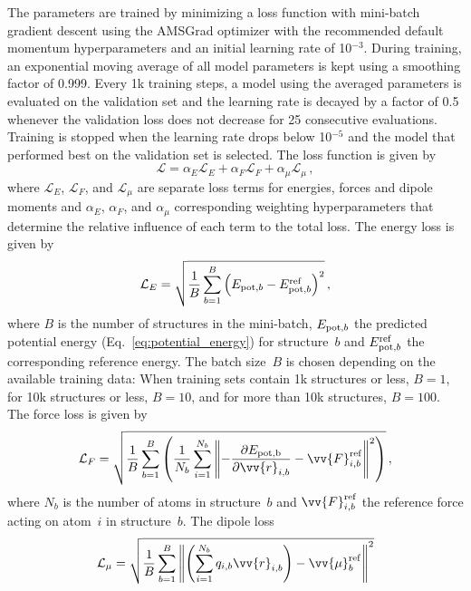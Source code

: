\documentclass[%
superscriptaddress,
reprint,
nofootinbib,
amsmath,amssymb,amsfonts,
floatfix,
altaffilletter,
showkeys,
]{revtex4-2}
\begin{document}
The parameters are trained by minimizing a loss function
with mini-batch gradient descent using the AMSGrad optimizer\cite{reddi2019convergence}  with the recommended default momentum hyperparameters and an initial learning rate of 10$^{-3}$. During training, an exponential moving average of all model parameters is kept using a smoothing factor of 0.999. Every 1k training steps, a model using the averaged parameters is evaluated on the validation set and the learning rate is decayed by a factor of 0.5 whenever the validation loss does not decrease for 25 consecutive evaluations. Training is stopped when the learning rate drops below 10$^{-5}$ and the model that performed best on the validation set is selected. The loss function is given by
\begin{equation}
\mathcal{L} = \alpha_E\mathcal{L}_E + \alpha_F\mathcal{L}_F+ \alpha_\mu\mathcal{L}_\mu\,,
\label{eq:loss}
\end{equation}
where $\mathcal{L}_E$, $\mathcal{L}_F$, and $\mathcal{L}_\mu$ are separate loss terms for energies, forces and dipole moments and $\alpha_E$, $\alpha_F$, and $\alpha_\mu$ corresponding weighting hyperparameters that determine the relative influence of each term to the total loss. The energy loss is given by
\begin{equation}
\mathcal{L}_E =\sqrt{\frac{1}{B}\sum_{b=1}^{B} \left(E_{{\rm pot},b}-E_{{\rm pot},b}^{\rm ref}\right)^2}\,,
\label{eq:energy_loss}
\end{equation}
where $B$ is the number of structures in the mini-batch, $E_{{\rm pot},b}$ the predicted potential energy (Eq.~\ref{eq:potential_energy}) for structure~$b$ and $E_{{\rm pot},b}^{\rm ref}$ the corresponding reference energy. The batch size~$B$ is chosen depending on the available training data: When training sets contain 1k structures or less, $B=1$, for 10k structures or less, $B=10$, and for more than 10k structures, $B=100$. The force loss is given by
\begin{equation}
\mathcal{L}_F =\sqrt{\frac{1}{B}\sum_{b=1}^{B}\left(\frac{1}{N_b}\sum_{i=1}^{N_b}\left\lVert{-\frac{\partial E_{{\rm pot,b}}}{\partial \vv{r}_{i,b}} - \vv{F}_{i,b}^{\rm ref}}\right\rVert^2\right)}\,,
\label{eq:forces_loss}
\end{equation}
where $N_b$ is the number of atoms in structure~$b$ and $\vv{F}_{i,b}^{\rm ref}$ the reference force acting on atom~$i$ in structure~$b$. The dipole loss
\begin{equation}
\mathcal{L}_\mu =\sqrt{\frac{1}{B}\sum_{b=1}^{B} \left\lVert\left(\sum_{i=1}^{N_b}q_{i,b}\vv{r}_{i,b}\right)-\vv{\mu}_b^{\rm ref}\right\rVert^2}
\label{eq:dipole_loss}
\end{equation}
\end{document}
